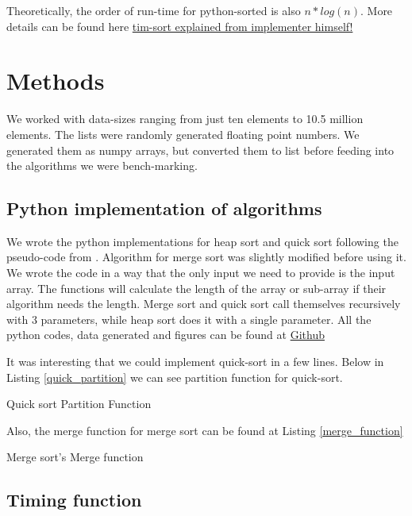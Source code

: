 \documentclass[sigconf, nonacm, natbib, screen, balance=False]{acmart}
\begin{document}
Theoretically, the order of run-time for python-sorted  is also $n*log(n)$. More details can be found here \citet{TimPetersArticle} \href{https://github.com/python/cpython/blob/master/Objects/listsort.txt}{tim-sort explained from implementer himself!}

\section{Methods}\label{sec:methods}
We worked with data-sizes ranging from just ten elements to 10.5 million elements. The lists were randomly generated floating point numbers. We generated them as numpy arrays, but converted them to list before feeding into the algorithms we were bench-marking.

\subsection{Python implementation of algorithms}\label{sec:python implementation}

We wrote the python implementations for heap sort and quick sort following the pseudo-code from \citet{CLRS_2009}. Algorithm for merge sort was slightly modified before using it. We wrote the code in a way that the only input we need to provide is the input array. The functions will calculate the length of the array or sub-array if their algorithm needs the length. Merge sort and quick sort call themselves recursively with 3 parameters, while heap sort does it with a single parameter. All the python codes, data generated and figures can be found at \href{https://github.com/vsnupoudel/termpaper01.}{Github} 

It was interesting that we could implement quick-sort in a few lines. Below in Listing \ref{quick_partition} we can see partition function
for quick-sort.
\begin{listing}
  \caption{Quick sort Partition Function}
  \label{quick_partition}

\end{listing}

Also, the merge function for merge sort can be found at Listing \ref{merge_function}

\begin{listing}
  \caption{Merge sort's Merge function}
  \label{merge_function}

\end{listing}

\subsection{Timing function}\label{sec:timing function}
\end{document}
